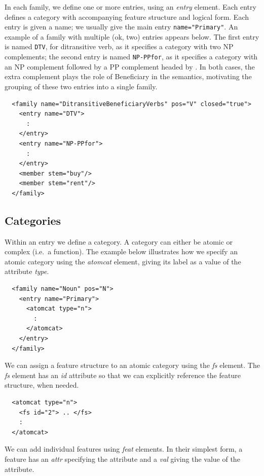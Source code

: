 \documentclass[11pt]{article}
\begin{document}
In each family, we define one or more entries, using an \textsl{entry}
element. Each entry defines a category with accompanying feature
structure and logical form. Each entry is given a name; we usually give 
the main entry \texttt{name="Primary"}.  An example of a family with
multiple (ok, two) entries appears below.  The first entry is named
\texttt{DTV}, for ditransitive verb, as it specifies a category with two
NP complements; the second entry is named \texttt{NP-PPfor}, as it
specifies a category with an NP complement followed by a PP complement
headed by .  In both cases, the extra complement plays the role
of Beneficiary in the semantics, motivating the grouping of these two
entries into a single family.

\begin{small}
\begin{verbatim}
  <family name="DitransitiveBeneficiaryVerbs" pos="V" closed="true">
    <entry name="DTV">
      :
    </entry>
    <entry name="NP-PPfor">
      :
    </entry>
    <member stem="buy"/>
    <member stem="rent"/>
  </family>
\end{verbatim}
\end{small}

\subsection{Categories}

Within an entry we define a category. A category can either be atomic 
or complex (i.e.\ a function). The example below illustrates how we 
specify an atomic category using the \textsl{atomcat} element, 
giving its label as a value of the attribute \textsl{type}. 

\begin{verbatim}
  <family name="Noun" pos="N">
    <entry name="Primary">
      <atomcat type="n">
        :
      </atomcat>
    </entry>
  </family>
\end{verbatim}

We can assign a feature structure to an atomic category using the
\textsl{fs} element. The \textsl{fs} element has an \textsl{id}
attribute so that we can explicitly reference the feature structure,
when needed.

\begin{verbatim}
  <atomcat type="n">
    <fs id="2"> .. </fs>
    :
  </atomcat>
\end{verbatim}

We can add individual features using \textsl{feat} elements. In their
simplest form, a feature has an \textsl{attr} specifying the
attribute and a \textsl{val} giving the value of the attribute.
\end{document}
